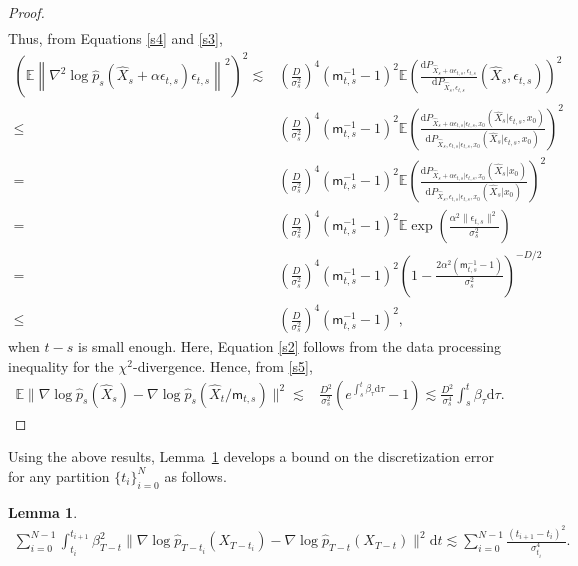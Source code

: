 \documentclass[12pts]{article}
\newtheorem{lemma}[defn]{Lemma}%
\newcommand{\diff}{\mathrm{d}}
\newcommand{\hX}{ \widehat{X}}
\newcommand{\E}{\mathbb{E}}
\newcommand{\hp}{\hat{p}}
\begin{document}
\begin{proof}
\begin{align}
\end{align}
Thus, from Equations \eqref{s4} and \eqref{s3},
\begingroup
\allowdisplaybreaks
\begin{align}
     \left(\E \left\| \nabla^2 \log \hp_s(\hX_s + \alpha \epsilon_{t,s}) \epsilon_{t,s}  \right\|^2 \right)^2 
    \lesssim 
    &  \left(\frac{D}{\sigma_s^2}\right)^4 (\mathsf{m}_{t,s}^{-1}-1)^2 \E \left( \frac{\diff  P_{\hX_s + \alpha \epsilon_{t,s}, \epsilon_{t,s}}}{\diff  P_{\hX_s, \epsilon_{t,s}}}(\hX_s, \epsilon_{t,s}) \right)^2 \nonumber\\
     \le  &  \left(\frac{D}{\sigma_s^2}\right)^4 (\mathsf{m}_{t,s}^{-1}-1)^2 \E \left( \frac{\diff  P_{\hX_s + \alpha \epsilon_{t,s}| \epsilon_{t,s}, x_0 } (\hX_s| \epsilon_{t,s}, x_0)}{\diff  P_{\hX_s, \epsilon_{t,s}| \epsilon_{t,s}, x_0}(\hX_s| \epsilon_{t,s}, x_0)} \right)^2 \label{s2}\\
    = & \left(\frac{D}{\sigma_s^2}\right)^4 (\mathsf{m}_{t,s}^{-1}-1)^2 \E \left( \frac{\diff  P_{\hX_s + \alpha \epsilon_{t,s}| \epsilon_{t,s}, x_0 } (\hX_s| x_0)}{\diff  P_{\hX_s, \epsilon_{t,s}| \epsilon_{t,s}, x_0}(\hX_s|  x_0)} \right)^2 \nonumber\\
    = & \left(\frac{D}{\sigma_s^2}\right)^4 (\mathsf{m}_{t,s}^{-1}-1)^2 \E \exp\left( \frac{\alpha^2 \|\epsilon_{t,s}\|^2}{\sigma_s^2}\right) \nonumber\\
    = & \left(\frac{D}{\sigma_s^2}\right)^4 (\mathsf{m}_{t,s}^{-1}-1)^2 \left(1 - \frac{2 \alpha^2 (\mathsf{m}_{t,s}^{-1}-1)}{\sigma_s^2}\right)^{-D/2} \nonumber\\
    \le & \left(\frac{D}{\sigma_s^2}\right)^4 (\mathsf{m}_{t,s}^{-1}-1)^2,\nonumber
\end{align}
\endgroup
when $t-s$ is small enough. Here, Equation \eqref{s2} follows from the data processing inequality for the  $\chi^2$-divergence. Hence, from \eqref{s5},
\begin{align*}
     \E \|\nabla \log \hp_s(\hX_s) - \nabla \log \hp_s(\hX_t/\mathsf{m}_{t,s})\|^2 \lesssim & \frac{D^2}{\sigma_s^2} \left( e^{\int_s^t \beta_\tau \diff  \tau} - 1\right) \lesssim \frac{D^2}{\sigma_s^4} \int_s^t \beta_\tau \diff  \tau.
\end{align*}
\end{proof}
Using the above results, Lemma~\ref{lem4} develops a bound on the discretization error for any partition $\{t_i\}_{i=0}^N$ as follows.
\begin{lemma}\label{lem4}
      \begin{align}
    \sum_{i=0}^{N-1}\int_{t_i}^{t_{i+1}} \beta^2_{T-t} \|\nabla \log \hp_{T-t_i}(X_{T-t_i}) - \nabla \log \hp_{T-t}(X_{T-t})\|^2 \diff  t 
    \lesssim \sum_{i=0}^{N-1}\frac{(t_{i+1} - t_i)^2}{\sigma_{t_i}^4}. \label{e24}
\end{align}
  \end{lemma}
\end{document}
